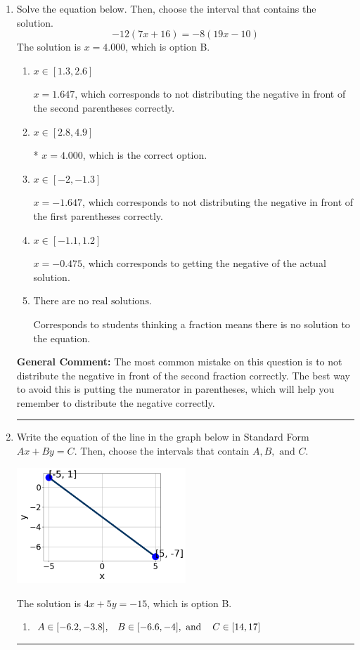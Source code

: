\documentclass{extbook}[14pt]
\newcommand{\litem}[1]{\item #1

\rule{\textwidth}{0.4pt}}
\begin{document}
\begin{enumerate}\litem{
Solve the equation below. Then, choose the interval that contains the solution.
\[ -12(7x + 16) = -8(19x -10) \]The solution is \( x = 4.000 \), which is option B.\begin{enumerate}[label=\Alph*.]
\item \( x \in [1.3, 2.6] \)

$x = 1.647$, which corresponds to not distributing the negative in front of the second parentheses correctly.
\item \( x \in [2.8, 4.9] \)

* $x = 4.000$, which is the correct option.
\item \( x \in [-2, -1.3] \)

$x = -1.647$, which corresponds to not distributing the negative in front of the first parentheses correctly.
\item \( x \in [-1.1, 1.2] \)

$x = -0.475$, which corresponds to getting the negative of the actual solution.
\item \( \text{There are no real solutions.} \)

Corresponds to students thinking a fraction means there is no solution to the equation.
\end{enumerate}

\textbf{General Comment:} The most common mistake on this question is to not distribute the negative in front of the second fraction correctly. The best way to avoid this is putting the numerator in parentheses, which will help you remember to distribute the negative correctly.
}
\litem{
Write the equation of the line in the graph below in Standard Form $Ax+By=C$. Then, choose the intervals that contain $A, B, \text{ and } C$.

\begin{center}
    \includegraphics[width=0.5\textwidth]{../Figures/linearGraphToStandardCopyA.png}
\end{center}


The solution is \( 4x + 5y = -15 \), which is option B.\begin{enumerate}[label=\Alph*.]
\item \( A \in [-6.2, -3.8], \hspace{3mm} B \in [-6.6, -4], \text{ and } \hspace{3mm} C \in [14, 17] \)


\end{enumerate}}
\end{enumerate}
\end{document}
